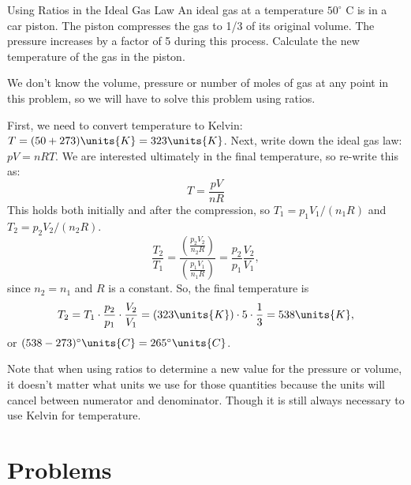 \begin{exampleb}{Using Ratios in the Ideal Gas Law}
  An ideal gas at a temperature $50^{\circ}$ C is in a car piston.
  The piston compresses the gas to 1/3 of its original volume.  The
  pressure increases by a factor of 5 during this process.  Calculate
  the new temperature of the gas in the piston.

  \solution We don't know the volume, pressure or number of moles of
  gas at any point in this problem, so we will have to solve this
  problem using ratios.

  First, we need to convert temperature to Kelvin: $T = (50+273)
  \units{K} = 323 \units{K}$.  Next, write down the ideal gas law: $pV
  = nRT$.  We are interested ultimately in the final temperature, so
  re-write this as:
  \begin{equation}
    T = \frac{pV}{nR}
  \end{equation}
  This holds both initially and after the compression, so $T_1 =
  p_1V_1/(n_1R)$ and $T_2 = p_2V_2/(n_2R)$.  
\begin{equation}
  \frac{T_2}{T_1} = \frac{\displaystyle\left(\frac{p_2V_2}{n_2R}\right) }
 {\displaystyle\left( \frac{p_1V_1}{n_1R}\right) } 
  = \frac{p_2}{p_1}\frac{V_2}{V_1},
\end{equation}
since $n_2 = n_1$ and $R$ is a constant.  So, the final temperature is
\begin{equation}
  T_2 = T_1 \cdot \frac{p_2}{p_1}\cdot\frac{V_2}{V_1} = 
  (323\units{K})\cdot 5 \cdot \frac{1}{3}
  = 538 \units{K} ,
\end{equation}
or $(538 - 273)^{\circ}\units{C} = 265^{\circ}\units{C}$.

Note that when using ratios to determine a new value for the pressure
or volume, it doesn't matter what units we use for those quantities
because the units will cancel between numerator and denominator. 
Though it is still always necessary to use Kelvin for temperature.
\end{exampleb}

\newpage

\section*{Problems}


